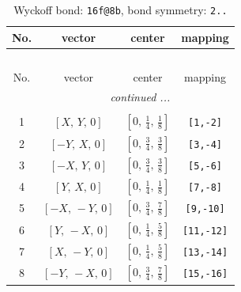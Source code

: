 \documentclass[fleqn,8pt]{jsarticle}
\begin{document}
\begin{longtable}{cccc}
\caption{Wyckoff bond: {\tt 16f@8b}, bond symmetry: {\tt 2..}}
 \\
 \hline \hline
No. & vector & center & mapping \\ \hline \endfirsthead

\multicolumn{3}{l}{\tablename\ \thetable{}} \\
 \hline \hline
No. & vector & center & mapping \\ \hline \endhead

 \hline \hline
\multicolumn{3}{r}{\footnotesize\it continued ...} \\ \endfoot

 \hline \hline
\multicolumn{3}{r}{} \\ \endlastfoot

1 & $\left[ X,\, Y,\, 0 \right]$ & $\left[ 0,\, \frac{1}{4},\, \frac{1}{8} \right]$ & {\tt [1,-2]} \\ \hline
2 & $\left[ - Y,\, X,\, 0 \right]$ & $\left[ 0,\, \frac{3}{4},\, \frac{3}{8} \right]$ & {\tt [3,-4]} \\ \hline
3 & $\left[ - X,\, Y,\, 0 \right]$ & $\left[ 0,\, \frac{3}{4},\, \frac{3}{8} \right]$ & {\tt [5,-6]} \\ \hline
4 & $\left[ Y,\, X,\, 0 \right]$ & $\left[ 0,\, \frac{1}{4},\, \frac{1}{8} \right]$ & {\tt [7,-8]} \\ \hline
5 & $\left[ - X,\, - Y,\, 0 \right]$ & $\left[ 0,\, \frac{3}{4},\, \frac{7}{8} \right]$ & {\tt [9,-10]} \\ \hline
6 & $\left[ Y,\, - X,\, 0 \right]$ & $\left[ 0,\, \frac{1}{4},\, \frac{5}{8} \right]$ & {\tt [11,-12]} \\ \hline
7 & $\left[ X,\, - Y,\, 0 \right]$ & $\left[ 0,\, \frac{1}{4},\, \frac{5}{8} \right]$ & {\tt [13,-14]} \\ \hline
8 & $\left[ - Y,\, - X,\, 0 \right]$ & $\left[ 0,\, \frac{3}{4},\, \frac{7}{8} \right]$ & {\tt [15,-16]} \\
\end{longtable}
\renewcommand{\arraystretch}{1.2}
\end{document}
